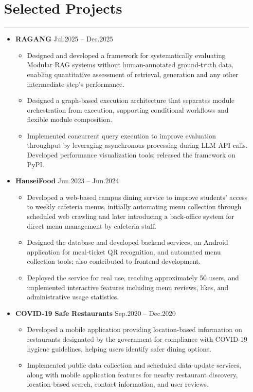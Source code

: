 \documentclass[letterpaper, 10pt]{article}
\begin{document}
\section*{Selected Projects}
\hrule
\vspace{8pt}
\begin{itemize}
\item[]
    \textbf{RAGANG} \hfill Jul.2025 -- Dec.2025
    \begin{itemize}
        \item Designed and developed a framework for systematically evaluating Modular RAG systems without human-annotated ground-truth data, enabling quantitative assessment of retrieval, generation and any other intermediate step's performance.
        \item Designed a graph-based execution architecture that separates module orchestration from execution, supporting conditional workflows and flexible module composition.
        \item Implemented concurrent query execution to improve evaluation throughput by leveraging asynchronous processing during LLM API calls. Developed performance visualization tools; released the framework on PyPI.
    \end{itemize}
\item[]
    \textbf{HanseiFood} \hfill Jun.2023 -- Jun.2024
    \begin{itemize}
        \item Developed a web-based campus dining service to improve students' access to weekly cafeteria menus, initially automating menu collection through scheduled web crawling and later introducing a back-office system for direct menu management by cafeteria staff.
        \item Designed the database and developed backend services, an Android application for meal-ticket QR recognition, and automated menu collection tools; also contributed to frontend development.
        \item Deployed the service for real use, reaching approximately 50 users, and implemented interactive features including menu reviews, likes, and administrative usage statistics.
    \end{itemize}
\item[]
    \textbf{COVID-19 Safe Restaurants} \hfill Sep.2020 -- Dec.2020
    \begin{itemize}
        \item Developed a mobile application providing location-based information on restaurants designated by the government for compliance with COVID-19 hygiene guidelines, helping users identify safer dining options.
        \item Implemented public data collection and scheduled data-update services, along with mobile application features for nearby restaurant discovery, location-based search, contact information, and user reviews.
    \end{itemize}
\end{itemize}
\end{document}
